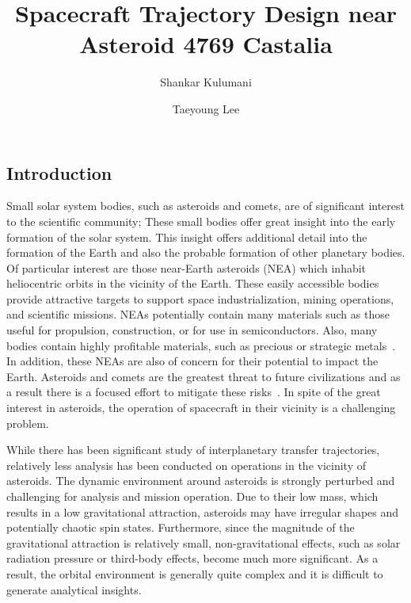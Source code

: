 \documentclass[11pt,reqno]{amsart} %
\title{Spacecraft Trajectory Design near Asteroid 4769 Castalia}
\author{Shankar Kulumani}
\author{Taeyoung Lee}
\date{} %
\begin{document}
\maketitle
\begin{multicols}{2}
\section{Introduction}
Small solar system bodies, such as asteroids and comets, are of significant interest to the scientific community; These small bodies offer great insight into the early formation of the solar system.
This insight offers additional detail into the formation of the Earth and also the probable formation of other planetary bodies.
Of particular interest are those near-Earth asteroids (NEA) which inhabit heliocentric orbits in the vicinity of the Earth.
These easily accessible bodies provide attractive targets to support space industrialization, mining operations, and scientific missions.
NEAs potentially contain many materials such as those useful for propulsion, construction, or for use in semiconductors.
Also, many bodies contain highly profitable materials, such as precious or strategic metals~\cite{ross2001}.
In addition, these NEAs are also of concern for their potential to impact the Earth.
Asteroids and comets are the greatest threat to future civilizations and as a result there is a focused effort to mitigate these risks~\cite{wie2008}.
In spite of the great interest in asteroids, the operation of spacecraft in their vicinity is a challenging problem.

While there has been significant study of interplanetary transfer trajectories, relatively less analysis has been conducted on operations in the vicinity of asteroids.
The dynamic environment around asteroids is strongly perturbed and challenging for analysis and mission operation.
Due to their low mass, which results in a low gravitational attraction, asteroids may have irregular shapes and potentially chaotic spin states.
Furthermore, since the magnitude of the gravitational attraction is relatively small, non-gravitational effects, such as solar radiation pressure or third-body effects, become much more significant.
As a result, the orbital environment is generally quite complex and it is difficult to generate analytical insights.


\end{multicols}
\end{document}
